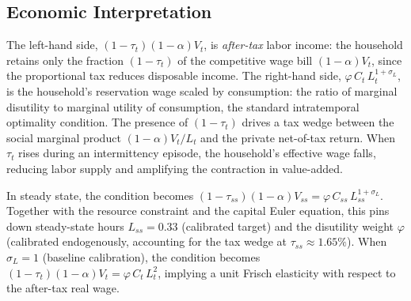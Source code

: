\documentclass[12pt, a4paper]{article}
\begin{document}
\subsection*{Economic Interpretation}

The left-hand side, $(1-\tau_t)(1-\alpha)V_t$, is \textit{after-tax} labor income: the household retains only the fraction $(1-\tau_t)$ of the competitive wage bill $(1-\alpha)V_t$, since the proportional tax reduces disposable income. The right-hand side, $\varphi\,C_t\,L_t^{1+\sigma_L}$, is the household's reservation wage scaled by consumption: the ratio of marginal disutility to marginal utility of consumption, the standard intratemporal optimality condition. The presence of $(1-\tau_t)$ drives a tax wedge between the social marginal product $(1-\alpha)V_t/L_t$ and the private net-of-tax return. When $\tau_t$ rises during an intermittency episode, the household's effective wage falls, reducing labor supply and amplifying the contraction in value-added.

In steady state, the condition becomes $(1-\tau_{ss})(1-\alpha)V_{ss} = \varphi\,C_{ss}\,L_{ss}^{1+\sigma_L}$. Together with the resource constraint and the capital Euler equation, this pins down steady-state hours $L_{ss} = 0.33$ (calibrated target) and the disutility weight $\varphi$ (calibrated endogenously, accounting for the tax wedge at $\tau_{ss} \approx 1.65\%$). When $\sigma_L = 1$ (baseline calibration), the condition becomes $(1-\tau_t)(1-\alpha)V_t = \varphi\,C_t\,L_t^2$, implying a unit Frisch elasticity with respect to the after-tax real wage.
\end{document}
